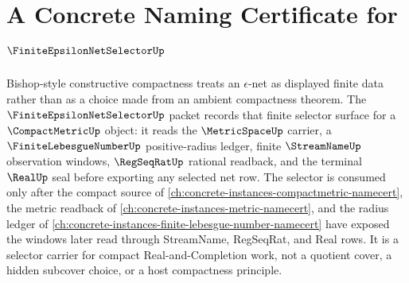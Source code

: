 \chapter{A Concrete Naming Certificate for $\FiniteEpsilonNetSelectorUp$}
\label{ch:concrete-instances-finite-epsilon-net-selector-namecert}

Bishop-style constructive compactness treats an $\epsilon$-net as displayed finite data rather than as a choice made from an ambient compactness theorem. The $\FiniteEpsilonNetSelectorUp$ packet records that finite selector surface for a $\CompactMetricUp$ object: it reads the $\MetricSpaceUp$ carrier, a $\FiniteLebesgueNumberUp$ positive-radius ledger, finite $\StreamNameUp$ observation windows, $\RegSeqRatUp$ rational readback, and the terminal $\RealUp$ seal before exporting any selected net row. The selector is consumed only after the compact source of \autoref{ch:concrete-instances-compactmetric-namecert}, the metric readback of \autoref{ch:concrete-instances-metric-namecert}, and the radius ledger of \autoref{ch:concrete-instances-finite-lebesgue-number-namecert} have exposed the windows later read through StreamName, RegSeqRat, and Real rows. It is a selector carrier for compact Real-and-Completion work, not a quotient cover, a hidden subcover choice, or a host compactness principle.

